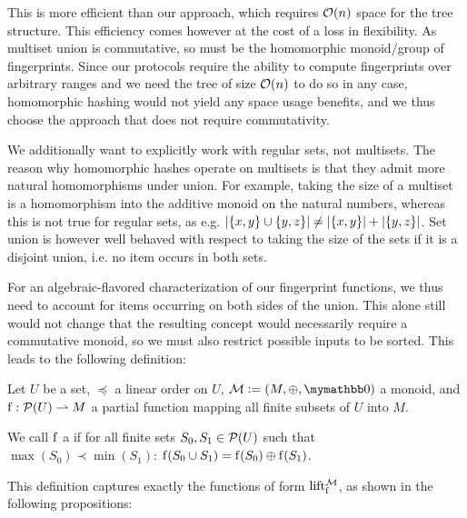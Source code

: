 This is more efficient than our approach, which requires $\mathcal{O}(n)$ space for the tree structure. This efficiency comes however at the cost of a loss in flexibility. As multiset union is commutative, so must be the homomorphic monoid/group of fingerprints. Since our protocols require the ability to compute fingerprints over arbitrary ranges and we need the tree of size $\mathcal{O}(n)$ to do so in any case, homomorphic hashing would not yield any space usage benefits, and we thus choose the approach that does not require commutativity.

We additionally want to explicitly work with regular sets, not multisets. The reason why homomorphic hashes operate on multisets is that they admit more natural homomorphisms under union. For example, taking the size of a multiset is a homomorphism into the additive monoid on the natural numbers, whereas this is not true for regular sets, as e.g. $|{\{x, y\} \cup \{y, z\}}| \neq |{\{x, y\}}| + |{\{y, z\}}|$. Set union is however well behaved with respect to taking the size of the sets if it is a disjoint union, i.e. no item occurs in both sets.

For an algebraic-flavored characterization of our fingerprint functions, we thus need to account for items occurring on both sides of the union. This alone still would not change that the resulting concept would necessarily require a commutative monoid, so we must also restrict possible inputs to be sorted. This leads to the following definition:

\begin{definition}
Let $U$ be a set, $\preceq$ a linear order on $U$, $\mathcal{M} \defeq (M, \groupaddsym, \neutraladd)$ a monoid, and ${\operatorname{f}}: {\mathcal{P}({U})} \rightharpoonup{M}$ a partial function mapping all finite subsets of $U$ into $M$.

We call $\operatorname{f}$ a  if for all finite sets $S_0, S_1 \in \mathcal{P}({U})$ such that $\max(S_0) \prec \min(S_1)$: $\operatorname{f}(S_0 \cup S_1) = {\operatorname{f}(S_0)} \oplus {\operatorname{f}(S_1)}$.
\end{definition}

This definition captures exactly the functions of form $\operatorname{lift_{\operatorname{f}}^{\mathcal{M}}}$, as shown in the following propositions:

